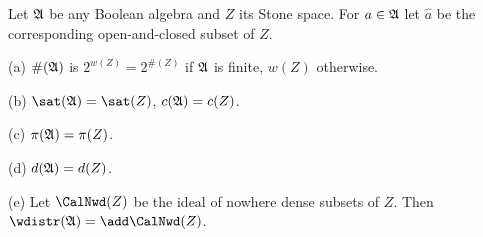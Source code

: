 Let $\frak A$ be any Boolean algebra and $Z$ its Stone space.   For
$a\in\frak A$ let $\widehat{a}$ be the corresponding open-and-closed
subset of $Z$.

(a) $\#(\frak A)$ is $2^{w(Z)}=2^{\#(Z)}$ if $\frak A$ is finite, $w(Z)$
otherwise.

(b) $\sat(\frak A)=\sat(Z)$, $c(\frak A)=c(Z)$.

(c) $\pi(\frak A)=\pi(Z)$.

(d) $d(\frak A)=d(Z)$.

(e) Let $\CalNwd(Z)$ be the ideal of nowhere dense subsets of $Z$.   Then
$\wdistr(\frak A)=\add\CalNwd(Z)$.

